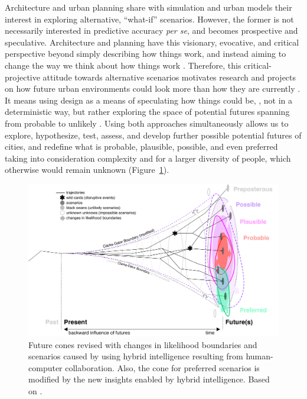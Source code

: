 Architecture and urban planning share with simulation and urban models their interest in exploring alternative, “what-if” scenarios. However, the former is not necessarily interested in predictive accuracy \emph{per se}, and becomes prospective and speculative. Architecture and planning have this visionary, evocative, and critical perspective beyond simply describing how things work, and instead aiming to change the way we think about how things work \citep{Doucet2009}. Therefore, this critical-projective attitude towards alternative scenarios motivates research and projects on how future urban environments could look more than how they are currently \citep{Meyboom2018,Townsend2014,SidewalkLabs2017}. It means using design as a means of speculating how things could be, \citep{Dunne2013}, not in a deterministic way, but rather exploring the space of potential futures spanning from probable to unlikely \citep{Gall2022}. Using both approaches simultaneously allows us to explore, hypothesize, test, assess, and develop further possible potential futures of cities, and redefine what is probable, plausible, possible, and even preferred taking into consideration complexity and for a larger diversity of people, which otherwise would remain unknown (Figure~\ref{fig:futures_cone}).


\begin{figure}[htbp!]
    \centering
    \includegraphics[width=1\textwidth]{chapters/00_introduction/figures/futures_cone.png}
    \captionsetup{format=plain, justification=centering} %
    \caption{Future cones revised with changes in likelihood boundaries and scenarios caused by using hybrid intelligence resulting from human-computer collaboration. Also, the cone for preferred scenarios is modified by the new insights enabled by hybrid intelligence. Based on \citep{Gall2022}.}
   \label{fig:futures_cone}
\end{figure}

